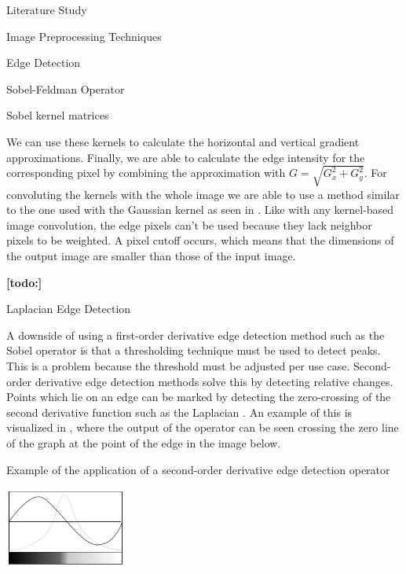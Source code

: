 \documentclass{matthijs}
\begin{document}
\begin{hoofdstuk}{Literature Study}
\begin{paragraaf}{Image Preprocessing Techniques}
\begin{subparagraaf}{Edge Detection}
\begin{subsubparagraaf}{Sobel-Feldman Operator}
\begin{figuur}{Sobel kernel matrices}
						\cite{sobel1990isotropic}

					\end{figuur}

					We can use these kernels to calculate the horizontal and vertical gradient approximations.
					Finally, we are able to calculate the edge intensity for the corresponding pixel by combining the approximation with $G = \sqrt{G_x^2 + G_y^2}$.
					For convoluting the kernels with the whole image we are able to use a method similar to the one used with the Gaussian kernel as seen in .
					Like with any kernel-based image convolution, the edge pixels can't be used because they lack neighbor pixels to be weighted.
					A pixel cutoff occurs, which means that the dimensions of the output image are smaller than those of the input image.

					\textbf{[todo:]}

				\end{subsubparagraaf}

				\begin{subsubparagraaf}{Laplacian Edge Detection}

					A downside of using a first-order derivative edge detection method such as the Sobel operator is that a thresholding technique must be used to detect peaks.
					This is a problem because the threshold must be adjusted per use case.
					Second-order derivative edge detection methods solve this by detecting relative changes.
					Points which lie on an edge can be marked by detecting the zero-crossing of the second derivative function such as the Laplacian \cite{humaidi2018fpga}.
					An example of this is visualized in , where the output of the operator can be seen crossing the zero line of the graph at the point of the edge in the image below.

					\begin{figuur}{Example of the application of a second-order derivative edge detection operator}

						\includegraphics[width=0.3\textwidth]{sinha2017sobel-img3.jpg}
						\cite{sinha2017sobel}


\end{figuur}
\end{subsubparagraaf}
\end{subparagraaf}
\end{paragraaf}
\end{hoofdstuk}
\end{document}

